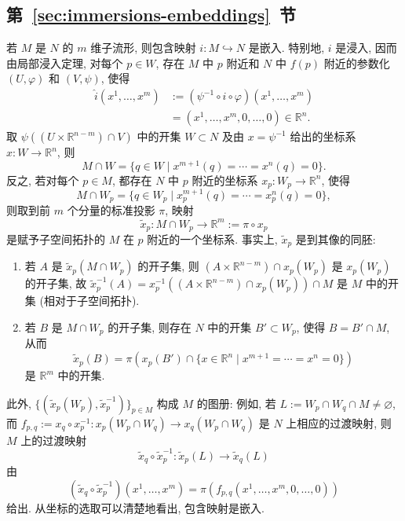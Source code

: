 \subsection{\texorpdfstring{第~\ref{sec:immersions-embeddings}~节}{浸入与嵌入}}\label{subsec:solutions-immersions-and-embeddings}

\begin{description}[font=\normalfont,leftmargin=2em,labelwidth=1.5em]
若 $M$ 是 $N$ 的 $m$ 维子流形, 则包含映射 $i:M\hookrightarrow N$ 是嵌入. 特别地, $i$ 是浸入, 因而由局部浸入定理, 对每个 $p\in W$, 存在 $M$ 中 $p$ 附近和 $N$ 中 $f(p)$ 附近的参数化 $(U,\varphi)$ 和 $(V,\psi)$, 使得
\begin{align*}
  \widehat i(x^1,\ldots,x^m)&:=(\psi^{-1}\circ i\circ\varphi)(x^1,\ldots,x^m)\\
  &=(x^1,\ldots,x^m,0,\ldots,0)\in\mathbb{R}^n.
\end{align*}
取 $\psi((U\times\mathbb{R}^{n-m})\cap V)$ 中的开集 $W\subset N$ 及由 $x=\psi^{-1}$ 给出的坐标系 $x:W\to\mathbb{R}^n$, 则
\[
  M\cap W=\{q\in W\mid x^{m+1}(q)=\cdots=x^n(q)=0\}.
\]
反之, 若对每个 $p\in M$, 都存在 $N$ 中 $p$ 附近的坐标系 $x_p:W_p\to\mathbb{R}^n$, 使得
\[
  M\cap W_p=\{q\in W_p\mid x_p^{m+1}(q)=\cdots=x_p^n(q)=0\},
\]
则取到前 $m$ 个分量的标准投影 $\pi$, 映射
\[
  \widetilde x_p:M\cap W_p\to\mathbb{R}^m:=\pi\circ x_p
\]
是赋予子空间拓扑的 $M$ 在 $p$ 附近的一个坐标系. 事实上, $\widetilde x_p$ 是到其像的同胚:
\begin{enumerate}[label=(\roman*),leftmargin=*]
\item 若 $A$ 是 $\widetilde x_p(M\cap W_p)$ 的开子集, 则 $(A\times\mathbb{R}^{n-m})\cap x_p(W_p)$ 是 $x_p(W_p)$ 的开子集, 故 $\widetilde x_p^{-1}(A)=x_p^{-1}((A\times\mathbb{R}^{n-m})\cap x_p(W_p))\cap M$ 是 $M$ 中的开集 (相对于子空间拓扑).
\item 若 $B$ 是 $M\cap W_p$ 的开子集, 则存在 $N$ 中的开集 $B'\subset W_p$, 使得 $B=B'\cap M$, 从而
\[
  \widetilde x_p(B)=\pi\left(x_p(B')\cap\{x\in\mathbb{R}^n\mid x^{m+1}=\cdots=x^n=0\}\right)
\]
是 $\mathbb{R}^m$ 中的开集.
\end{enumerate}
此外, $\{(\widetilde x_p(W_p),\widetilde x_p^{-1})\}_{p\in M}$ 构成 $M$ 的图册: 例如, 若 $L:=W_p\cap W_q\cap M\ne\varnothing$, 而 $f_{p,q}:=x_q\circ x_p^{-1}:x_p(W_p\cap W_q)\to x_q(W_p\cap W_q)$ 是 $N$ 上相应的过渡映射, 则 $M$ 上的过渡映射
\[
  \widetilde x_q\circ\widetilde x_p^{-1}:\widetilde x_p(L)\to\widetilde x_q(L)
\]
由
\[
  (\widetilde x_q\circ\widetilde x_p^{-1})(x^1,\ldots,x^m)
  =\pi(f_{p,q}(x^1,\ldots,x^m,0,\ldots,0))
\]
给出. 从坐标的选取可以清楚地看出, 包含映射是嵌入.


\end{description}
